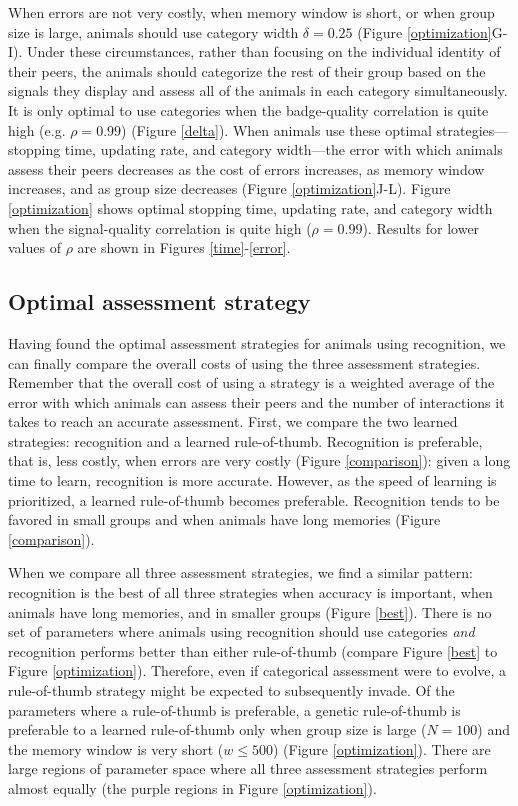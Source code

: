 When errors are not very costly, when memory window is short, or when group size is large, animals should use category width $\delta=0.25$ (Figure \ref{optimization}G-I). Under these circumstances, rather than focusing on the individual identity of their peers, the animals should categorize the rest of their group based on the signals they display and assess all of the animals in each category simultaneously. It is only optimal to use categories when the badge-quality correlation is quite high (e.g. $\rho=0.99$) (Figure \ref{delta}). When animals use these optimal strategies---stopping time, updating rate, and category width---the error with which animals assess their peers decreases as the cost of errors increases, as memory window increases, and as group size decreases (Figure \ref{optimization}J-L). Figure \ref{optimization} shows optimal stopping time, updating rate, and category width when the signal-quality correlation is quite high ($\rho=0.99$). Results for lower values of $\rho$ are shown in Figures \ref{time}-\ref{error}.

\subsection*{Optimal assessment strategy}
Having found the optimal assessment strategies for animals using recognition, we can finally compare the overall costs of using the three assessment strategies. Remember that the overall cost of using a strategy is a weighted average of the error with which animals can assess their peers and the number of interactions it takes to reach an accurate assessment. First, we compare the two learned strategies: recognition and a learned rule-of-thumb. Recognition is preferable, that is, less costly, when errors are very costly (Figure \ref{comparison}): given a long time to learn, recognition is more accurate. However, as the speed of learning is prioritized, a learned rule-of-thumb becomes preferable. Recognition tends to be favored in small groups and when animals have long memories (Figure \ref{comparison}).

When we compare all three assessment strategies, we find a similar pattern: recognition is the best of all three strategies when accuracy is important, when animals have long memories, and in smaller groups (Figure \ref{best}). There is no set of parameters where animals using recognition should use categories \emph{and} recognition performs better than either rule-of-thumb (compare Figure \ref{best} to Figure \ref{optimization}). Therefore, even if categorical assessment were to evolve, a rule-of-thumb strategy might be expected to subsequently invade. Of the parameters where a rule-of-thumb is preferable, a genetic rule-of-thumb is preferable to a learned rule-of-thumb only when group size is large ($N=100$) and the memory window is very short ($w\leq500$) (Figure \ref{optimization}). There are large regions of parameter space where all three assessment strategies perform almost equally (the purple regions in Figure \ref{optimization}).

